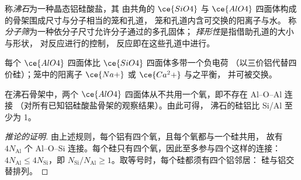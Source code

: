 \begin{definition}[沸石]\label{def:b3:inorganic-materials:zeolite}
称\emph{沸石}为一种晶态铝硅酸盐，其
由共角的 $\ce{SiO4}$ 与 $\ce{AlO4}$ 四面体构成的骨架围成尺寸与分子相当的笼和孔道，
笼和孔道内含可交换的阳离子与水。
称\emph{分子筛}为一种依分子尺寸允许分子通过的多孔固体；
\emph{择形性}是指借助孔道的大小与形状，
对反应进行的控制，
反应即在这些孔道中进行。
\end{definition}

每个 $\ce{AlO4}$ 四面体比 $\ce{SiO4}$ 四面体多带一个负电荷
（以三价铝代替四价硅）；笼中的阳离子 $\ce{Na+}$ 或 $\ce{Ca^2+}$ 与之平衡，
并可被交换。

\begin{proposition}[洛文斯坦规则]\label{prop:b3:inorganic-materials:lowenstein}
在沸石骨架中，两个 $\ce{AlO4}$ 四面体从不共用一个氧，即不存在 Al--O--Al 连接
（对所有已知铝硅酸盐骨架的观察结果）。由此可得，
沸石的硅铝比 Si/Al 至少为 1。
\end{proposition}

\begin{proof}[推论的证明]
由上述规则，每个铝有四个氧，且每个氧都与一个硅共用，
故有 $4N_{\mathrm{Al}}$ 个 Al--O--Si 连接。每个硅只有四个氧，因此至多参与四个这样的连接：
$4N_{\mathrm{Al}} \le 4N_{\mathrm{Si}}$，即 $N_{\mathrm{Si}}/N_{\mathrm{Al}} \ge 1$。取等号时，每个硅都须有四个铝邻居：
硅与铝交替排列。
\end{proof}

